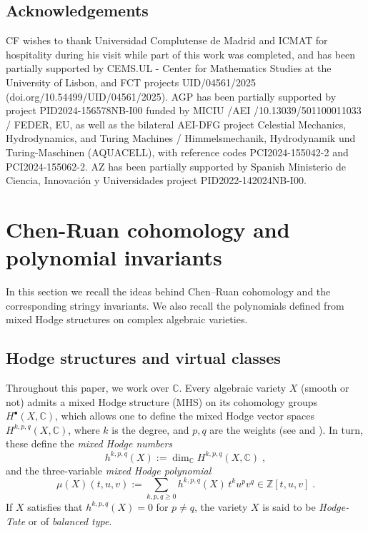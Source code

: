 \documentclass[11pt,english]{amsart}
\numberwithin{equation}{section}
\numberwithin{figure}{section}
\theoremstyle{plain}
\theoremstyle{plain}
\theoremstyle{definition}
\theoremstyle{remark}
\newcommand{\ZZ}{\mathbb{Z}}
\newcommand{\CC}{\mathbb{C}}
\begin{document}
\subsection*{Acknowledgements}

CF wishes to thank Universidad Complutense de Madrid and ICMAT for hospitality during his visit while part of this work was completed, and has been partially supported by CEMS.UL - Center for Mathematics Studies at the University of Lisbon, and FCT projects     UID/04561/2025  (doi.org/10.54499/UID/04561/2025). AGP has been partially supported by project PID2024-156578NB-I00 funded by MICIU /AEI /10.13039/501100011033 / FEDER, EU, as well as the bilateral AEI-DFG project Celestial Mechanics, Hydrodynamics, and Turing Machines / Himmelsmechanik, Hydrodynamik und Turing-Maschinen (AQUACELL), with reference codes PCI2024-155042-2 and PCI2024-155062-2. AZ has been partially supported by Spanish Ministerio de Ciencia, Innovaci\'on y Universidades project PID2022-142024NB-I00.

\section{Chen-Ruan cohomology and polynomial invariants}\label{sec:Chen-Ruan}

In this section we recall the ideas behind Chen--Ruan cohomology and the corresponding stringy invariants. We also recall the polynomials defined from mixed Hodge structures on complex algebraic varieties.

\subsection{Hodge structures and virtual classes}

Throughout this paper, we work over $\mathbb{C}$. Every algebraic variety $X$ (smooth or not) admits a mixed Hodge structure (MHS) on its cohomology groups $H^\bullet(X,\CC)$, 
which allows one to define the mixed Hodge vector spaces $H^{k,p,q}(X,\mathbb{C})$, where $k$ is the degree, and $p,q$ are the weights (see \cite[Theoreme 3.2.5]{De1} and \cite[Proposition 8.3.9]{De2}). In turn, these define the \emph{mixed Hodge numbers}
\[
h^{k,p,q}(X):=\dim_{\mathbb{C}}H^{k,p,q}(X,\mathbb{C})\; ,
\]
and the three-variable \emph{mixed Hodge polynomial}
\[
\mu(X)(t,u,v):=\sum_{k,p,q\geq0}h^{k,p,q}(X)\,t^{k}u^{p}v^{q} \in \ZZ[t,u,v]\; .
\]
If $X$ satisfies that $h^{k,p,q}(X) = 0$ for $p \neq q$, the variety $X$ is said to be \emph{Hodge-Tate} or of \emph{balanced type}. 
\end{document}
